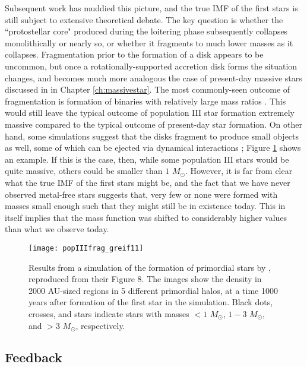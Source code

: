 Subsequent work has muddied this picture, and the true IMF of the first stars is still subject to extensive theoretical debate. The key question is whether the ``protostellar core" produced during the loitering phase subsequently collapses monolithically or nearly so, or whether it fragments to much lower masses as it collapses. Fragmentation prior to the formation of a disk appears to be uncommon, but once a rotationally-supported accretion disk forms the situation changes, and becomes much more analogous the case of present-day massive stars discussed in in Chapter \ref{ch:massivestar}. The most commonly-seen outcome of fragmentation is formation of binaries with relatively large mass ratios \citep[e.g.,][]{stacy13a}. This would still leave the typical outcome of population III star formation extremely massive compared to the typical outcome of present-day star formation. On other hand, some simulations suggest that the disks fragment to produce small objects as well, some of which can be ejected via dynamical interactions \citep{clark11a, greif11a}; Figure \ref{fig:greif11a} shows an example. If this is the case, then, while some population III stars would be quite massive, others could be smaller than $1$ $M_\odot$. However, it is far from clear what the true IMF of the first stars might be, and the fact that we have never observed metal-free stars suggests that, very few or none were formed with masses small enough such that they might still be in existence today. This in itself implies that the mass function was shifted to considerably higher values than what we observe today.

\begin{figure}
\texttt{[image: popIIIfrag\_greif11]}
\caption[Disk fragmentation around a primordial star]{
\label{fig:greif11a}
Results from a simulation of the formation of primordial stars by \citet{greif11a}, reproduced from their Figure 8. The images show the density in 2000 AU-sized regions in 5 different primordial halos, at a time 1000 years after formation of the first star in the simulation. Black dots, crosses, and stars indicate stars with masses $<1$ $M_\odot$, $1-3$ $M_\odot$, and $>3$ $M_\odot$, respectively.
}
\end{figure}


\subsection{Feedback}

